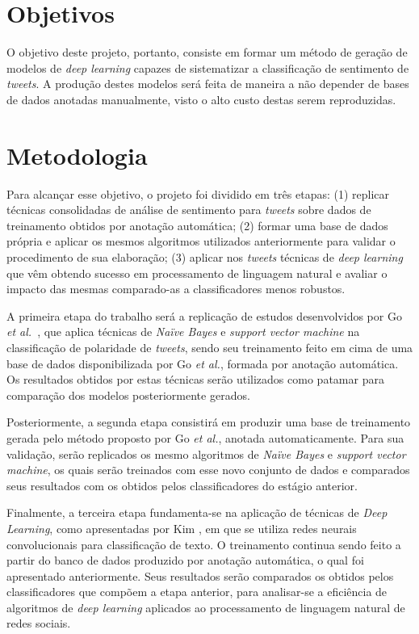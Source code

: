 \section{Objetivos}

O objetivo deste projeto, portanto, consiste em formar um método de geração de modelos de \textit{deep learning} capazes
de sistematizar a classificação de sentimento de \textit{tweets}.
A produção destes modelos será feita de maneira a não depender de bases de dados anotadas manualmente, visto o alto
custo destas serem reproduzidas.

\section{Metodologia}

Para alcançar esse objetivo, o projeto foi dividido em três etapas: (1) replicar técnicas consolidadas de análise de
sentimento para \textit{tweets} sobre dados de treinamento obtidos por anotação automática; (2) formar uma base de dados
própria e aplicar os mesmos algoritmos utilizados anteriormente para validar o procedimento de sua elaboração; (3)
aplicar nos \textit{tweets} técnicas de \textit{deep learning} que vêm obtendo sucesso em processamento de linguagem
natural e avaliar o impacto das mesmas comparado-as a classificadores menos robustos.

A primeira etapa do trabalho será a replicação de estudos desenvolvidos por Go \textit{et al.}~\cite{go09}, que aplica
técnicas de \textit{Naïve Bayes} e \textit{support vector machine} na classificação de polaridade de \textit{tweets},
sendo seu treinamento feito em cima de uma base de dados disponibilizada por Go \textit{et al.}, formada por anotação
automática.
Os resultados obtidos por estas técnicas serão utilizados como patamar para comparação dos modelos posteriormente
gerados.

Posteriormente, a segunda etapa consistirá em produzir uma base de treinamento gerada pelo método proposto por Go
\textit{et al.}, anotada automaticamente.
Para sua validação, serão replicados os mesmo algoritmos de \textit{Naïve Bayes} e \textit{support vector machine},
os quais serão treinados com esse novo conjunto de dados e comparados seus resultados com os obtidos pelos
classificadores do estágio anterior.

Finalmente, a terceira etapa fundamenta-se na aplicação de técnicas de \textit{Deep Learning}, como apresentadas por
Kim \cite{kim14}, em que se utiliza redes neurais convolucionais para classificação de texto.
O treinamento continua sendo feito a partir do banco de dados produzido por anotação automática, o qual foi apresentado
anteriormente.
Seus resultados serão comparados os obtidos pelos classificadores que compõem a etapa anterior, para analisar-se a
eficiência de algoritmos de \textit{deep learning} aplicados ao processamento de linguagem natural de redes sociais.

